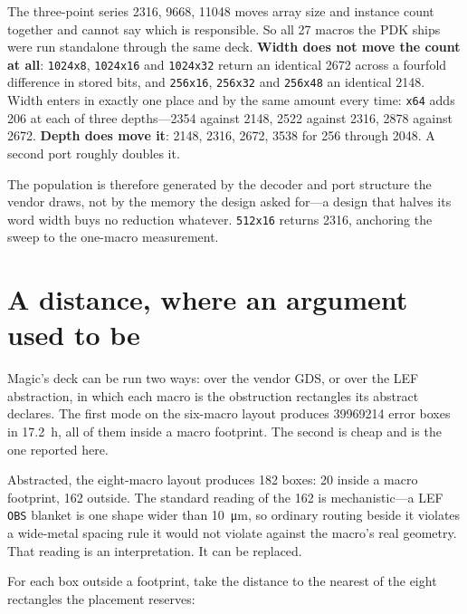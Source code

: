 \documentclass[11pt,a4paper]{article}
\begin{document}
The three-point series \num{2316}, \num{9668}, \num{11048} moves array
size and instance count together and cannot say which is responsible. So
all \num{27} macros the PDK ships were run standalone through the same
deck. \textbf{Width does not move the count at all}: \texttt{1024x8},
\texttt{1024x16} and \texttt{1024x32} return an identical \num{2672}
across a fourfold difference in stored bits, and \texttt{256x16},
\texttt{256x32} and \texttt{256x48} an identical \num{2148}. Width
enters in exactly one place and by the same amount every time:
\texttt{x64} adds \num{206} at each of three depths---\num{2354}
against \num{2148}, \num{2522} against \num{2316}, \num{2878} against
\num{2672}. \textbf{Depth does move it}: \num{2148}, \num{2316},
\num{2672}, \num{3538} for \num{256} through \num{2048}. A second
port roughly doubles it.

The population is therefore generated by the decoder and port structure
the vendor draws, not by the memory the design asked for---a design that
halves its word width buys no reduction whatever. \texttt{512x16}
returns \num{2316}, anchoring the sweep to the one-macro measurement.

\section{A distance, where an argument used to be}
\label{sec:distance}

Magic's deck can be run two ways: over the vendor GDS, or over the LEF
abstraction, in which each macro is the obstruction rectangles its
abstract declares. The first mode on the six-macro layout produces
\num{39969214} error boxes in \SI{17.2}{\hour}, all of them inside a macro
footprint. The second is cheap and is the one reported here.

Abstracted, the eight-macro layout produces \num{182} boxes: \num{20}
inside a macro footprint, \num{162} outside. The standard reading of the
\num{162} is mechanistic---a LEF \texttt{OBS} blanket is one shape wider
than \SI{10}{\micro\meter}, so ordinary routing beside it violates a
wide-metal spacing rule it would not violate against the macro's real
geometry. That reading is an interpretation. It can be replaced.

For each box outside a footprint, take the distance to the nearest of the
eight rectangles the placement reserves:
\end{document}
